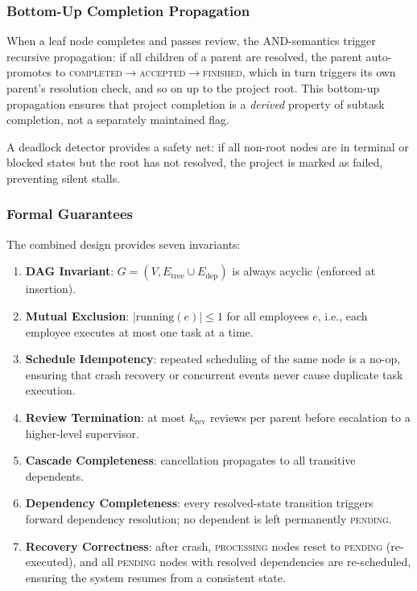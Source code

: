\documentclass[11pt,a4paper]{article}
\begin{document}
\subsubsection{Bottom-Up Completion Propagation}

When a leaf node completes and passes review, the AND-semantics trigger recursive propagation: if all children of a parent are resolved, the parent auto-promotes to \textsc{completed}$\to$\textsc{accepted}$\to$\textsc{finished}, which in turn triggers its own parent’s resolution check, and so on up to the project root. This bottom-up propagation ensures that project completion is a \emph{derived} property of subtask completion, not a separately maintained flag.

A deadlock detector provides a safety net: if all non-root nodes are in terminal or blocked states but the root has not resolved, the project is marked as failed, preventing silent stalls.

\subsubsection{Formal Guarantees}

The combined design provides seven invariants:

\begin{enumerate}
    \item \textbf{DAG Invariant}: $G = (V, E_{\text{tree}} \cup E_{\text{dep}})$ is always acyclic (enforced at insertion).
    \item \textbf{Mutual Exclusion}: $|\text{running}(e)| \leq 1$ for all employees $e$, i.e., each employee executes at most one task at a time.
    \item \textbf{Schedule Idempotency}: repeated scheduling of the same node is a no-op, ensuring that crash recovery or concurrent events never cause duplicate task execution.
    \item \textbf{Review Termination}: at most $k_{\text{rev}}$ reviews per parent before escalation to a higher-level supervisor.
    \item \textbf{Cascade Completeness}: cancellation propagates to all transitive dependents.
    \item \textbf{Dependency Completeness}: every resolved-state transition triggers forward dependency resolution; no dependent is left permanently \textsc{pending}.
    \item \textbf{Recovery Correctness}: after crash, \textsc{processing} nodes reset to \textsc{pending} (re-executed), and all \textsc{pending} nodes with resolved dependencies are re-scheduled, ensuring the system resumes from a consistent state.
\end{enumerate}
\end{document}
